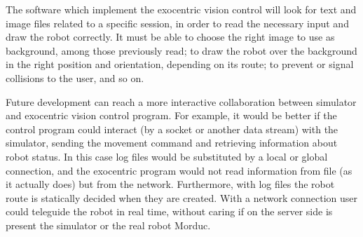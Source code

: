 %
The software which implement the exocentric vision control 
will look for text and image files related to a specific 
session, in order to read the necessary input and draw the 
robot correctly. It must be able to choose the right image 
to use as background, among those previously read; to draw 
the robot over the background in the right position and 
orientation, depending on its route; to prevent or signal 
collisions to the user, and so on.
%

%
Future development can reach a more interactive collaboration 
between simulator and exocentric vision control program. For
example, it would be better if the control program could 
interact (by a socket or another data stream) with the 
simulator, sending the movement command and retrieving 
information about robot status. In this case log files 
would be substituted by a local or global connection, 
and the exocentric program would not read information from 
file (as it actually does) but from the network.
Furthermore, with log files the robot route is statically 
decided when they are created. With a network connection user
could teleguide the robot in real time, without caring 
if on the server side is present the simulator or the real 
robot Morduc.
